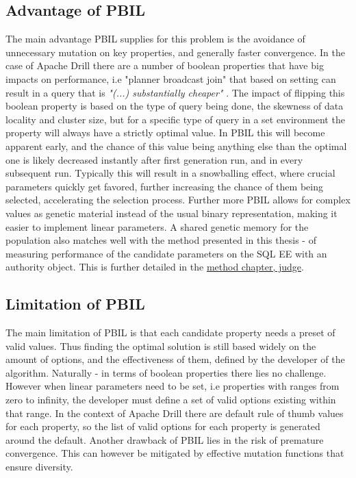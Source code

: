 \documentclass[a4paper,english]{report}
\begin{document}
		\subsection{Advantage of PBIL}
		The main advantage PBIL supplies for this problem is the avoidance of unnecessary mutation on key properties, and generally faster convergence. In the case of Apache Drill there are a number of boolean properties that have big impacts on performance, i.e "planner broadcast join" that based on setting can result in a query that is \textit{"(...) substantially cheaper"} \cite{joinplanning}. The impact of flipping this boolean property is based on the type of query being done, the skewness of data locality and cluster size, but for a specific type of query in a set environment the property will always have a strictly optimal value. In PBIL this will become apparent early, and the chance of this value being anything else than the optimal one is likely decreased instantly after first generation run, and in every subsequent run. Typically this will result in a snowballing effect, where crucial parameters quickly get favored, further increasing the chance of them being selected, accelerating the selection process. Further more PBIL allows for complex values as genetic material instead of the usual binary representation, making it easier to implement linear parameters. A shared genetic memory for the population also matches well with the method presented in this thesis - of measuring performance of the candidate parameters on the SQL EE with an authority object. This is further detailed in the \hyperref[sec:judge]{method chapter, judge}.
		\subsection{Limitation of PBIL}
		The main limitation of PBIL is that each candidate property needs a preset of valid values. Thus finding the optimal solution is still based widely on the amount of options, and the effectiveness of them, defined by the developer of the algorithm. Naturally - in terms of boolean properties there lies no challenge. However when linear parameters need to be set, i.e properties with ranges from zero to infinity, the developer must define a set of valid options existing within that range. In the context of Apache Drill there are default rule of thumb values for each property, so the list of valid options for each property is generated around the default.
		Another drawback of PBIL lies in the risk of premature convergence. This can however be mitigated by effective mutation functions that ensure diversity.
	\pagebreak
\end{document}
